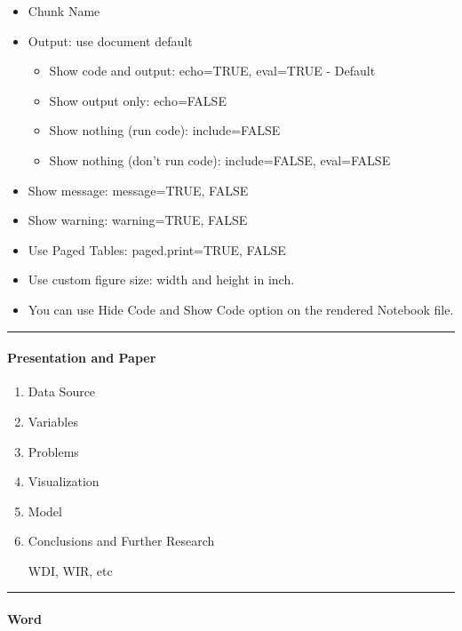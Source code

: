 \documentclass[
]{article}
\providecommand{\tightlist}{%
  \setlength{\itemsep}{0pt}\setlength{\parskip}{0pt}}
\begin{document}
\begin{itemize}
\item
  Chunk Name
\item
  Output: use document default

  \begin{itemize}
  \tightlist
  \item
    Show code and output: echo=TRUE, eval=TRUE - Default
  \item
    Show output only: echo=FALSE
  \item
    Show nothing (run code): include=FALSE
  \item
    Show nothing (don't run code): include=FALSE, eval=FALSE
  \end{itemize}
\item
  Show message: message=TRUE, FALSE
\item
  Show warning: warning=TRUE, FALSE
\item
  Use Paged Tables: paged.print=TRUE, FALSE
\item
  Use custom figure size: width and height in inch.
\item
  You can use Hide Code and Show Code option on the rendered Notebook
  file.
\end{itemize}

\begin{center}\rule{0.5\linewidth}{0.5pt}\end{center}

\hypertarget{presentation-and-paper}{%
\paragraph{Presentation and Paper}\label{presentation-and-paper}}

\begin{enumerate}
\def\labelenumi{\arabic{enumi}.}
\item
  Data Source
\item
  Variables
\item
  Problems
\item
  Visualization
\item
  Model
\item
  Conclusions and Further Research

  WDI, WIR, etc
\end{enumerate}

\begin{center}\rule{0.5\linewidth}{0.5pt}\end{center}

\hypertarget{word}{%
\paragraph{Word}\label{word}}
\end{document}
